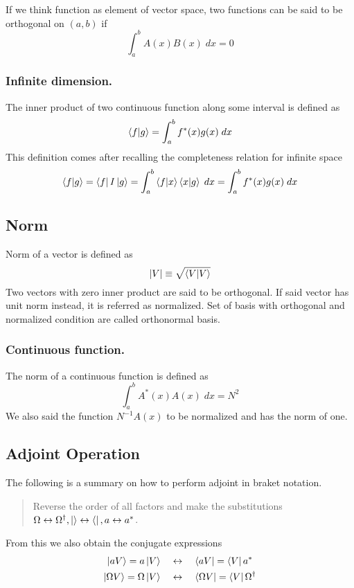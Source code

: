 \documentclass[../main.tex]{subfiles}
\begin{document}
If we think function as element of vector space, two functions can be said to be orthogonal on $(a,b)$ if
\begin{equation*}
	\int_{a}^{b}A(x)B(x)\;dx=0
\end{equation*}

\subsubsection*{Infinite dimension.}
The inner product of two continuous function along some interval is defined as
\begin{equation*}
	\braket{f|g}=\int_{a}^{b}f ^*(x)g(x)\;dx
\end{equation*}
This definition comes after recalling the completeness relation for infinite space 
\begin{equation*}
	\braket{f|g}=\bra{f}I \ket{g}=\int_{a }^{b}\braket{f|x}\braket{x|g}\;dx=\int_{a }^{b} f ^*(x)g(x)\;dx
\end{equation*}

\subsection*{Norm}
Norm of a vector is defined as
\begin{equation*}
	|V|\equiv\sqrt{\braket{V|V}}
\end{equation*}
Two vectors with zero inner product are said to be orthogonal.
If said vector has unit norm instead, it is referred as normalized.
Set of basis with orthogonal and normalized condition are called orthonormal basis.

\subsubsection*{Continuous function.}
The norm of a continuous function is defined as
\begin{equation*}
	\int_{a}^{b}A^*(x)A(x)\;dx=N^2
\end{equation*}
We also said the function $N^{-1}A(x)$ to be normalized and has the norm of one.

\subsection*{Adjoint Operation}
The following is a summary on how to perform adjoint in braket notation.
\begin{quotation}
	Reverse the order of all factors and make the substitutions $\Omega\leftrightarrow\Omega^\dagger,\ket{}\leftrightarrow \bra{}, a\leftrightarrow a^*$.
\end{quotation}
From this we also obtain the conjugate expressions
\begin{align*}
	\ket{aV}=a \ket{V}\quad            & \leftrightarrow \quad\bra{aV}=\bra{V}a^*                 \\
	\ket{\Omega V}=\Omega \ket{V}\quad & \leftrightarrow\quad\bra{\Omega V}=\bra{V}\Omega^\dagger
\end{align*}
\end{document}
